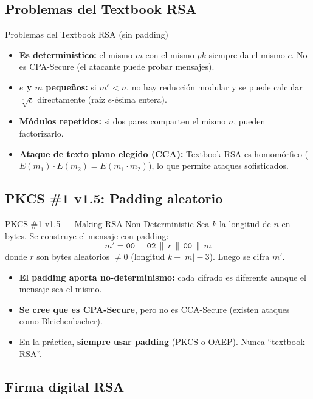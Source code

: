 \documentclass[11pt,a4paper]{article}
\begin{document}
\subsection{Problemas del Textbook RSA}

\begin{warnbox}{Problemas del Textbook RSA (sin padding)}
\begin{itemize}
  \item \textbf{Es determinístico:} el mismo $m$ con el mismo $pk$ siempre da el mismo $c$. No es CPA-Secure (el atacante puede probar mensajes).
  \item \textbf{$e$ y $m$ pequeños:} si $m^e < n$, no hay reducción modular y se puede calcular $\sqrt[e]{c}$ directamente (raíz $e$-ésima entera).
  \item \textbf{Módulos repetidos:} si dos pares comparten el mismo $n$, pueden factorizarlo.
  \item \textbf{Ataque de texto plano elegido (CCA):} Textbook RSA es homomórfico ($E(m_1)\cdot E(m_2) = E(m_1\cdot m_2)$), lo que permite ataques sofisticados.
\end{itemize}
\end{warnbox}

\subsection{PKCS \#1 v1.5: Padding aleatorio}

\begin{teoriabox}{PKCS \#1 v1.5 --- Making RSA Non-Deterministic}
Sea $k$ la longitud de $n$ en bytes. Se construye el mensaje con padding:
\[
  m' = \texttt{00}\,\|\,\texttt{02}\,\|\,r\,\|\,\texttt{00}\,\|\,m
\]
donde $r$ son bytes aleatorios $\ne 0$ (longitud $k - |m| - 3$). Luego se cifra $m'$.
\begin{itemize}
  \item \textbf{El padding aporta no-determinismo:} cada cifrado es diferente aunque el mensaje sea el mismo.
  \item \textbf{Se cree que es CPA-Secure}, pero no es CCA-Secure (existen ataques como Bleichenbacher).
  \item En la práctica, \textbf{siempre usar padding} (PKCS o OAEP). Nunca ``textbook RSA''.
\end{itemize}
\end{teoriabox}

\subsection{Firma digital RSA}
\end{document}
